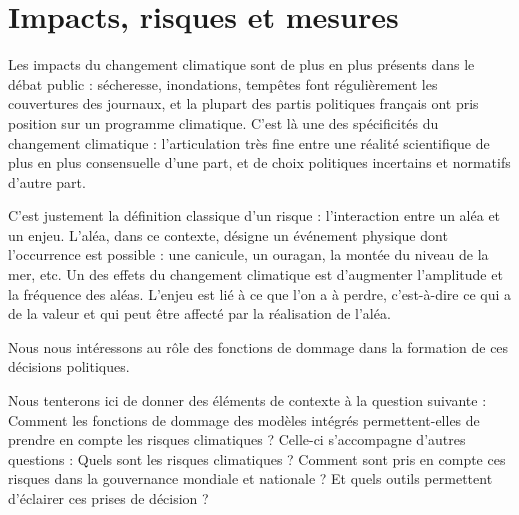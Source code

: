 \chapter{Impacts, risques et mesures}
\label{chapter:introduction}
\newrefsegment


\newpage


Les impacts du changement climatique sont de plus en plus présents dans le débat public : sécheresse, inondations, tempêtes font régulièrement les couvertures des journaux, et la plupart des partis politiques français ont pris position sur un programme climatique. C'est là une des spécificités du changement climatique : l'articulation très fine entre une réalité scientifique de plus en plus consensuelle d'une part, et de choix politiques incertains et normatifs d'autre part. 


C'est justement la définition classique d'un risque : l'interaction entre un aléa et un enjeu. L'aléa, dans ce contexte, désigne un événement physique dont l'occurrence est possible : une canicule, un ouragan, la montée du niveau de la mer, etc. Un des effets du changement climatique est d'augmenter l'amplitude et la fréquence des aléas. L'enjeu est lié à ce que l'on a à perdre, c'est-à-dire ce qui a de la valeur et qui peut être affecté par la réalisation de l'aléa. 

Nous nous intéressons au rôle des fonctions de dommage dans la formation de ces décisions politiques. 



Nous tenterons ici de donner des éléments de contexte à la question suivante : 
Comment les fonctions de dommage des modèles intégrés permettent-elles de prendre en compte les risques climatiques ? Celle-ci s'accompagne d'autres questions : Quels sont les risques climatiques ? Comment sont pris en compte ces risques dans la gouvernance mondiale et nationale ? Et quels outils permettent d'éclairer ces prises de décision ? 



